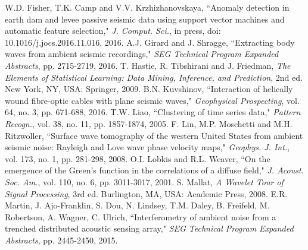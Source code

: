\documentclass[11pt]{article}
\begin{document}
\begin{thebibliography}{30}
 W.D. Fisher, T.K. Camp and V.V. Krzhizhanovskaya, ``Anomaly detection in earth dam and levee passive seismic data using support vector machines and automatic feature selection," \textit{J. Comput. Sci.}, in press, doi: 10.1016/j.jocs.2016.11.016, 2016.
\vspace{-0.2cm}
 A.J. Girard and J. Shragge, ``Extracting body waves from ambient seismic recordings," \textit{SEG Technical Program Expanded Abstracts}, pp. 2715-2719, 2016.
\vspace{-0.2cm}
 T. Hastie, R. Tibshirani and J. Friedman, \textit{The Elements of Statistical Learning: Data Mining, Inference, and Prediction}, 2nd ed. New York, NY, USA: Springer, 2009.
\vspace{-0.2cm}
 B.N. Kuvshinov, ``Interaction of helically wound fibre-optic cables with plane seismic waves," \textit{Geophysical Prospecting}, vol. 64, no. 3, pp. 671-688, 2016.
\vspace{-0.2cm}
 T.W. Liao, ``Clustering of time series data," \textit{Pattern Recogn.}, vol. 38, no. 11, pp. 1857-1874, 2005.
\vspace{-0.2cm}
 F. Lin, M.P. Moschetti and M.H. Ritzwoller, ``Surface wave tomography of the western United States from ambient seismic noise: Rayleigh and Love wave phase velocity maps," \textit{Geophys. J. Int.}, vol. 173, no. 1, pp. 281-298, 2008.
\vspace{-0.2cm}
 O.I. Lobkis and R.L. Weaver, ``On the emergence of the Green's function in the correlations of a diffuse field," \textit{J. Acoust. Soc. Am.}, vol. 110, no. 6, pp. 3011-3017, 2001.
\vspace{-0.2cm}
 S. Mallat, \textit{A Wavelet Tour of Signal Processing}, 3rd ed. Burlington, MA, USA: Academic Press, 2008.
\vspace{-0.2cm}
 E.R. Martin, J. Ajo-Franklin, S. Dou, N. Lindsey, T.M. Daley, B. Freifeld, M. Robertson, A. Wagner, C. Ulrich, ``Interferometry of ambient noise from a trenched distributed acoustic sensing array," \textit{SEG Technical Program Expanded Abstracts}, pp. 2445-2450, 2015.

\end{thebibliography}
\end{document}
